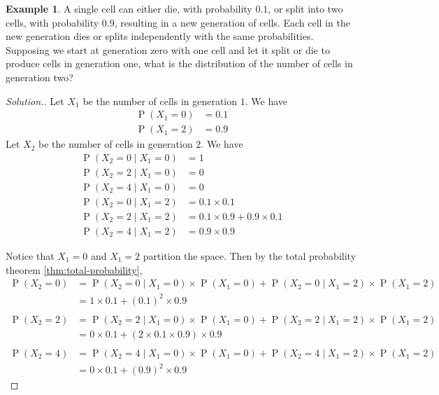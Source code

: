 \documentclass[11pt]{article}
\makeatletter
\theoremstyle{definition}
\newtheorem{eg}{Example}
\theoremstyle{remark}
\newenvironment{solution}{
    \let\oldqedsymbol=\qedsymbol%
    \def\@addpunct##1{}%
    \renewcommand{\qedsymbol}{$\blacktriangleleft$}%
    \begin{proof}[\textit Solution.]
}{
    \end{proof}%
    \renewcommand{\qedsymbol}{\oldqedsymbol}
}
\newcommand{\parens}[1]{\left(#1\right)}
\newcommand{\given}{\;\vert\;}
\DeclareMathOperator{\Prob}{P}
\renewcommand{\P}[1]{\Prob{\parens{#1}}}
\makeatother
\begin{document}
\begin{eg}
    A single cell can either die, with probability $0.1$, or split into two
    cells, with probability $0.9$, resulting in a new generation of cells. Each
    cell in the new generation dies or splits independently with the same
    probabilities. Supposing we start at generation zero with one cell and let
    it split or die to produce cells in generation one, what is the
    distribution of the number of cells in generation two?
\end{eg}

\begin{solution}
    Let $X_1$ be the number of cells in generation $1$. We have
    \begin{align*}
        \P{X_1 = 0} &= 0.1 \\
        \P{X_1 = 2} &= 0.9
    \end{align*}
    Let $X_2$ be the number of cells in generation $2$. We have
    \begin{align*}
        \P{X_2 = 0 \given X_1 = 0} &= 1 \\
        \P{X_2 = 2 \given X_1 = 0} &= 0 \\
        \P{X_2 = 4 \given X_1 = 0} &= 0 \\
        \P{X_2 = 0 \given X_1 = 2} &= 0.1 \times 0.1 \\
        \P{X_2 = 2 \given X_1 = 2} &= 0.1 \times 0.9 + 0.9 \times 0.1 \\
        \P{X_2 = 4 \given X_1 = 2} &= 0.9 \times 0.9
    \end{align*}

    Notice that $X_1 = 0$ and $X_1 = 2$ partition the space.
    Then by the total probability theorem \eqref{thm:total-probability},
    \begin{align*}
        \P{X_2 = 0}
        &= \P{X_2 = 0 \given X_1 = 0} \times \P{X_1 = 0}
        + \P{X_2 = 0 \given X_1 = 2} \times \P{X_1 = 2} \\
        &= 1 \times 0.1 + (0.1)^2 \times 0.9 \\
        \\
        \P{X_2 = 2}
        &= \P{X_2 = 2 \given X_1 = 0} \times \P{X_1 = 0}
        + \P{X_2 = 2 \given X_1 = 2} \times \P{X_1 = 2} \\
        &= 0 \times 0.1 + (2 \times 0.1 \times 0.9) \times 0.9 \\
        \\
        \P{X_2 = 4}
        &= \P{X_2 = 4 \given X_1 = 0} \times \P{X_1 = 0}
        + \P{X_2 = 4 \given X_1 = 2} \times \P{X_1 = 2} \\
        &= 0 \times 0.1 + (0.9)^2\times 0.9
    \end{align*}
\end{solution}
\end{document}

